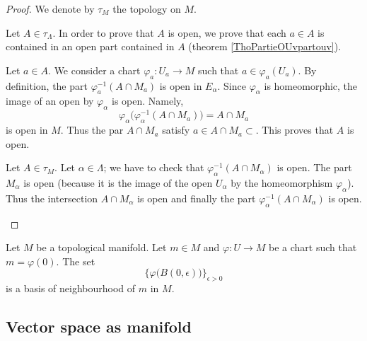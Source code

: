 \begin{proof}
	We denote by \( \tau_M\) the topology on \( M\).
	\begin{subproof}
		Let \( A\in \tau_{\Lambda}\). In order to prove that \( A\) is open, we prove that each \( a\in A\) is contained in an open part contained in \( A\) (theorem \ref{ThoPartieOUvpartouv}).

		Let \( a\in A\). We consider a chart \(\varphi_a \colon U_a\to M  \) such that \( a\in\varphi_a(U_a)\). By definition, the part \( \varphi_a^{-1}(A\cap M_a)\) is open in \( E_{\alpha}\). Since \( \varphi_{\alpha}\) is homeomorphic, the image of an open by \( \varphi_{\alpha}\) is open. Namely,
		\begin{equation}
			\varphi_{\alpha}\Big( \varphi_{\alpha}^{-1}(A\cap M_a) \Big)=A\cap M_a
		\end{equation}
		is open in \( M\). Thus the par \( A\cap M_a\) satisfy \( a\in A\cap M_a\subset\). This proves that \( A\) is open.

		Let \( A\in \tau_M\). Let \( \alpha\in\Lambda\); we have to check that \( \varphi_{\alpha}^{-1}(A\cap M_{\alpha})\) is open. The part \( M_{\alpha}\) is open (because it is the image of the open \( U_{\alpha}\) by the homeomorphism \( \varphi_{\alpha}\)). Thus the intersection \( A\cap M_{\alpha}\) is open and finally the part \( \varphi_{\alpha}^{-1}(A\cap M_{\alpha})\) is open.
	\end{subproof}
\end{proof}

\begin{proposition}			\label{PROPooGAZZooWIPVuf}
	Let \( M\) be a topological manifold. Let \( m\in M\) and \(\varphi \colon U\to M  \) be a chart such that \( m=\varphi(0)\). The set
	\begin{equation}
		\{ \varphi\big( B(0,\epsilon) \big) \}_{\epsilon>0}
	\end{equation}
	is a basis of neighbourhood of \( m\) in \( M\).
\end{proposition}


\subsection{Vector space as manifold}


